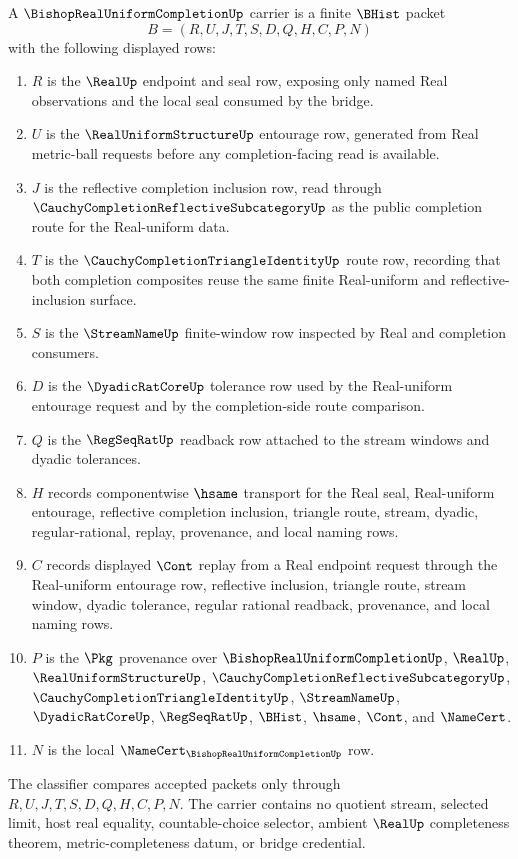 \begin{definition}
\label{def:bishop-real-uniform-completion-carrier}
A $\BishopRealUniformCompletionUp$ carrier is a finite $\BHist$ packet
$$
B=(R,U,J,T,S,D,Q,H,C,P,N)
$$
with the following displayed rows:
\begin{enumerate}
\item $R$ is the $\RealUp$ endpoint and seal row, exposing only named Real observations and the local seal consumed by the bridge.
\item $U$ is the $\RealUniformStructureUp$ entourage row, generated from Real metric-ball requests before any completion-facing read is available.
\item $J$ is the reflective completion inclusion row, read through $\CauchyCompletionReflectiveSubcategoryUp$ as the public completion route for the Real-uniform data.
\item $T$ is the $\CauchyCompletionTriangleIdentityUp$ route row, recording that both completion composites reuse the same finite Real-uniform and reflective-inclusion surface.
\item $S$ is the $\StreamNameUp$ finite-window row inspected by Real and completion consumers.
\item $D$ is the $\DyadicRatCoreUp$ tolerance row used by the Real-uniform entourage request and by the completion-side route comparison.
\item $Q$ is the $\RegSeqRatUp$ readback row attached to the stream windows and dyadic tolerances.
\item $H$ records componentwise $\hsame$ transport for the Real seal, Real-uniform entourage, reflective completion inclusion, triangle route, stream, dyadic, regular-rational, replay, provenance, and local naming rows.
\item $C$ records displayed $\Cont$ replay from a Real endpoint request through the Real-uniform entourage row, reflective inclusion, triangle route, stream window, dyadic tolerance, regular rational readback, provenance, and local naming rows.
\item $P$ is the $\Pkg$ provenance over $\BishopRealUniformCompletionUp$, $\RealUp$, $\RealUniformStructureUp$, $\CauchyCompletionReflectiveSubcategoryUp$, $\CauchyCompletionTriangleIdentityUp$, $\StreamNameUp$, $\DyadicRatCoreUp$, $\RegSeqRatUp$, $\BHist$, $\hsame$, $\Cont$, and $\NameCert$.
\item $N$ is the local $\NameCert_{\BishopRealUniformCompletionUp}$ row.
\end{enumerate}
The classifier compares accepted packets only through $R,U,J,T,S,D,Q,H,C,P,N$. The carrier contains no quotient stream, selected limit, host real equality, countable-choice selector, ambient $\RealUp$ completeness theorem, metric-completeness datum, or bridge credential.
\end{definition}

